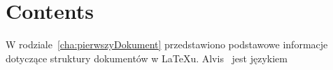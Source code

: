 
\section{Contents}
\label{sec:contents}

W rodziale~\ref{cha:pierwszyDokument} przedstawiono podstawowe informacje dotyczące struktury dokumentów w \LaTeX u. Alvis~\cite{Alvis2011} jest językiem 



















